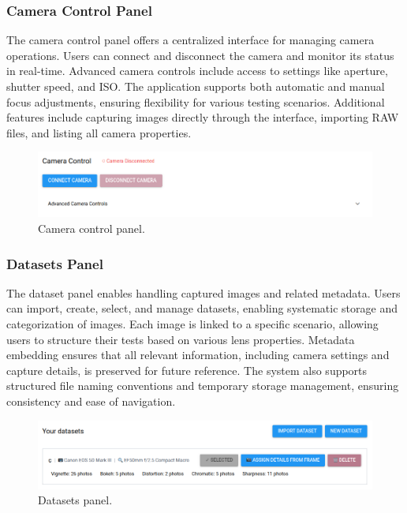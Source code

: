 \subsubsection{Camera Control Panel}
The camera control panel offers a centralized interface for managing camera operations. Users can connect and disconnect the camera and monitor its status in real-time. Advanced camera controls include access to settings like aperture, shutter speed, and ISO. The application supports both automatic and manual focus adjustments, ensuring flexibility for various testing scenarios. Additional features include capturing images directly through the interface, importing RAW files, and listing all camera properties.

\begin{figure}[h]
\centering
\includegraphics[width=1\textwidth]{Images/camera_control.png}
\caption{Camera control panel.}
\label{fig:ui_camera_control}
\end{figure}

\subsubsection{Datasets Panel}
The dataset panel enables handling captured images and related metadata. Users can import, create, select, and manage datasets, enabling systematic storage and categorization of images. Each image is linked to a specific scenario, allowing users to structure their tests based on various lens properties. Metadata embedding ensures that all relevant information, including camera settings and capture details, is preserved for future reference. The system also supports structured file naming conventions and temporary storage management, ensuring consistency and ease of navigation.

\begin{figure}[h]
\centering
\includegraphics[width=1\textwidth]{Images/datasets_panel.png}
\caption{Datasets panel.}
\label{fig:ui_datasets}
\end{figure}

